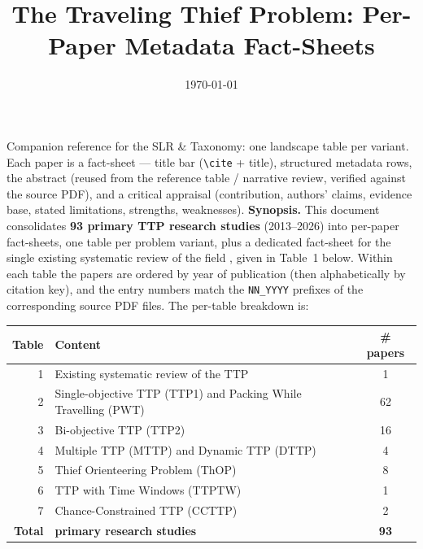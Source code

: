 \documentclass[
  a4paper,
  11pt,
  headings=small,
  numbers=noenddot,
  abstract=on,
  parskip=half,
]{scrartcl}
\begin{document}
\title{The Traveling Thief Problem: Per-Paper Metadata Fact-Sheets}
\date{\today}
\maketitle
\noindent\small Companion reference for the SLR \& Taxonomy: one landscape table per variant. Each paper is a fact-sheet --- title bar (\texttt{\textbackslash cite} + title), structured metadata rows, the abstract (reused from the reference table / narrative review, verified against the source PDF), and a critical appraisal (contribution, authors' claims, evidence base, stated limitations, strengths, weaknesses).\normalsize
\bigskip
\noindent\textbf{Synopsis.} This document consolidates \textbf{93 primary TTP research studies} (2013--2026) into per-paper fact-sheets, one table per problem variant, plus a dedicated fact-sheet for the single existing systematic review of the field \citep{sarkar2024travelling}, given in Table~1 below. Within each table the papers are ordered by year of publication (then alphabetically by citation key), and the entry numbers match the \texttt{NN\_YYYY} prefixes of the corresponding source PDF files. The per-table breakdown is:
\smallskip
\begin{center}\small
\begin{tabular}{@{}rlc@{}}
\toprule
\textbf{Table} & \textbf{Content} & \textbf{\# papers} \\
\midrule
1 & Existing systematic review of the TTP & 1 \\
2 & Single-objective TTP (TTP1) and Packing While Travelling (PWT) & 62 \\
3 & Bi-objective TTP (TTP2) & 16 \\
4 & Multiple TTP (MTTP) and Dynamic TTP (DTTP) & 4 \\
5 & Thief Orienteering Problem (ThOP) & 8 \\
6 & TTP with Time Windows (TTPTW) & 1 \\
7 & Chance-Constrained TTP (CCTTP) & 2 \\
\midrule
\textbf{Total} & \textbf{primary research studies} & \textbf{93} \\
\bottomrule
\end{tabular}
\end{center}
\bigskip
\end{document}
